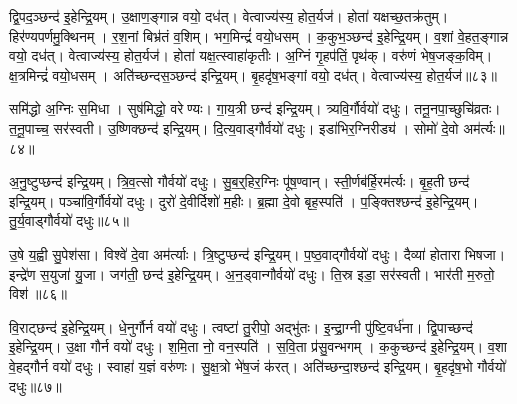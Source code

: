 द्वि॒पद॒ञ्छन्द॑ इ॒हेन्द्रि॒यम्।
उ॒क्षाण॒ङ्गान्न वयो॒ दध॑त्।
वेत्वाज्य॑स्य॒ होत॒र्यज॑।
होता॑ यक्षच्छ॒तक्र॑तुम्।
हिर॑ण्यपर्णमु॒क्थिनम्।
र॒श॒नां बिभ्र॑तं व॒शिम्।
भग॒मिन्द्रं॑ वयो॒धसम्।
क॒कुभ॒ञ्छन्द॑ इ॒हेन्द्रि॒यम्।
व॒शां वे॒हत॒ङ्गान्न वयो॒ दध॑त्।
वेत्वाज्य॑स्य॒ होत॒र्यज॑।
होता॑ यक्ष॒त्स्वाहा॑कृतीः।
अ॒ग्निं गृ॒हप॑तिं॒ पृथ॑क्।
वरु॑णं भेष॒जङ्क॒विम्।
क्ष॒त्रमिन्द्रं॑ वयो॒धसम्।
अति॑च्छन्दस॒ञ्छन्द॑ इन्द्रि॒यम्।
बृ॒हदृ॑ष॒भङ्गां वयो॒ दध॑त्।
वेत्वाज्य॑स्य॒ होत॒र्यज॑॥८३॥

समि॑द्धो अ॒ग्निः स॒मिधा।
सुष॑मिद्धो॒ वरेण्यः।
गा॒य॒त्री छन्द॑ इन्द्रि॒यम्।
त्र्यवि॒र्गौर्वयो॑ दधुः।
तनू॒नपा॒च्छुचि॑व्रतः।
त॒नू॒पाच्च॒ सर॑स्वती।
उ॒ष्णिक्छन्द॑ इन्द्रि॒यम्।
दि॒त्य॒वाड्गौर्वयो॑ दधुः।
इडा॑भिर॒ग्निरीड्य॑।
सोमो॑ दे॒वो अम॑र्त्यः॥८४॥

अ॒नु॒ष्टुप्छन्द॑ इन्द्रि॒यम्।
त्रि॒व॒त्सो गौर्वयो॑ दधुः।
सु॒ब॒र्॒हिर॒ग्निः पू॑ष॒ण्वान्।
स्ती॒र्णब॑र्हि॒रम॑र्त्यः।
बृ॒ह॒ती छन्द॑ इन्द्रि॒यम्।
पञ्चा॑वि॒र्गौर्वयो॑ दधुः।
दुरो॑ दे॒वीर्दिशो॑ म॒हीः।
ब्र॒ह्मा दे॒वो बृह॒स्पति॑।
प॒ङ्क्तिश्छन्द॑ इ॒हेन्द्रि॒यम्।
तु॒र्य॒वाड्गौर्वयो॑ दधुः॥८५॥

उ॒षे य॒ह्वी सु॒पेश॑सा।
विश्वे॑ दे॒वा अम॑र्त्याः।
त्रि॒ष्टुप्छन्द॑ इन्द्रि॒यम्।
प॒ष्ठ॒वाद्गौर्वयो॑ दधुः।
दैव्या॑ होतारा भिषजा।
इन्द्रे॑ण स॒युजा॑ यु॒जा।
जग॑ती॒ छन्द॑ इ॒हेन्द्रि॒यम्।
अ॒न॒ड्वान्गौर्वयो॑ दधुः।
ति॒स्र इडा॒ सर॑स्वती।
भार॑ती म॒रुतो॒ विश॑॥८६॥

वि॒राट्छन्द॑ इ॒हेन्द्रि॒यम्।
धे॒नुर्गौर्न वयो॑ दधुः।
त्वष्टा॑ तु॒रीपो॒ अद्भु॑तः।
इ॒न्द्रा॒ग्नी पु॑ष्टि॒वर्ध॑ना।
द्वि॒पाच्छन्द॑ इ॒हेन्द्रि॒यम्।
उ॒क्षा गौर्न वयो॑ दधुः।
श॒मि॒ता नो॒ वन॒स्पति॑।
स॒वि॒ता प्र॑सु॒वन्भगम्।
क॒कुच्छन्द॑ इ॒हेन्द्रि॒यम्।
व॒शा वे॒हद्गौर्न वयो॑ दधुः।
स्वाहा॑ य॒ज्ञं वरु॑णः।
सु॒क्ष॒त्रो भे॑ष॒जं क॑रत्।
अति॑च्छन्दा॒श्छन्द॑ इन्द्रि॒यम्।
बृ॒हदृ॑ष॒भो गौर्वयो॑ दधुः॥८७॥\anuvakamend[अम॑र्त्यस्तुर्य॒वाड्गौर्वयो॑ दधु॒र्विशो॑ व॒शा वे॒हद्गौर्न वयो॑ दधुश्च॒त्वारि॑ च]

